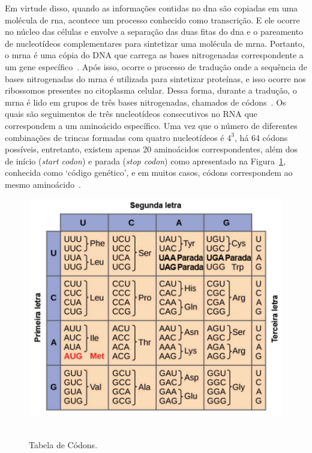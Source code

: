 Em virtude disso, quando as informações contidas no \gls{dna} são copiadas em uma molécula de \gls{rna}, acontece um processo conhecido como transcrição. E ele ocorre no núcleo das células e envolve a separação das duas fitas do \gls{dna} e o pareamento de nucleotídeos complementares para sintetizar uma molécula de \gls{mrna}. Portanto, o \gls{mrna} é uma cópia do DNA que carrega as bases nitrogenadas correspondente a um gene específico~\cite{alberts_biologia_2017}.
Após isso, ocorre o processo de tradução onde a sequência de bases nitrogenadas do \gls{mrna} é utilizada para sintetizar proteínas, e isso ocorre nos ribossomos presentes no citoplasma celular. Dessa forma, durante a tradução, o \gls{mrna} é lido em grupos de três bases nitrogenadas, chamados de códons~\cite{alberts_biologia_2017}. Os quais são seguimentos de três nucleotídeos consecutivos no RNA que correspondem a um aminoácido específico. Uma vez que o número de diferentes combinações de trincas formadas com quatro nucleotídeos é $4^3$, há 64 códons possíveis, entretanto, existem apenas 20 aminoácidos correspondentes, além dos de início (\textit{start codon}) e parada (\textit{stop codon}) como apresentado na Figura~\ref{fig:tabelaCodons}, conhecida como `código genético', e em muitos casos, códons correspondem ao mesmo aminoácido~\cite{alberts_biologia_2017}.
\begin{figure}[htb]
  \centering
  \caption{Tabela de Códons.}
  \includegraphics[scale=0.6]{figuras/tabelaCodons.pdf}
  ~\label{fig:tabelaCodons}
\end{figure}

